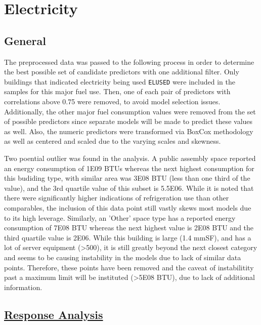 \section*{Electricity}
\label{sec:electricity}

\subsection{General}

The preprocessed data was passed to the following process in order to determine the best possible set of candidate predictors with one additional filter.  Only buildings that indicated electricity being used \lstinline{ELUSED} were included in the samples for this major fuel use.  Then, one of each pair of predictors with correlations above 0.75 were removed, to avoid model selection issues. Additionally, the other major fuel consumption values were removed from the set of possible predictors since separate models will be made to predict these values as well.  Also, the numeric predictors were transformed via BoxCox methodology as well as centered and scaled due to the varying scales and skewness.

Two poential outlier was found in the analysis. A public assembly space reported an energy consumption of 1E09 BTUs whereas the next highest consumption for this budiding type, with similar area was  3E08 BTU (less than one third of the value), and the 3rd quartile value of this subset is 5.5E06.  While it is noted that there were significantly higher indications of refrigeration use than other comparables, the inclusion of this data point still vastly skews most models due to its high leverage.  Similarly, an 'Other' space type has a reported energy consumption of 7E08 BTU whereas the next highest value is 2E08 BTU and the third quartile value is 2E06.  While this building is large (1.4 mmSF), and has a lot of server equipment (>500), it is still greatly beyond the next closest category and seems to be causing instability in the models due to lack of similar data points.  Therefore, these points have been removed and the caveat of instabilitity past a maximum limit will be instituted (>5E08 BTU), due to lack of additional information.

\subsection{\hyperref[appendix:electricity:response]{Response Analysis}}

